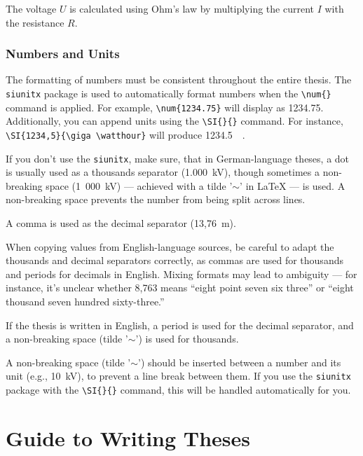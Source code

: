 \documentclass[a4paper, fleqn, headsepline, footsepline, 12pt, parskip=half]{scrartcl}
\begin{document}
The voltage $U$ is calculated using Ohm’s law by multiplying the current $I$ with the resistance $R$.


\subsubsection{Numbers and Units}
\label{sec:numbersAndUnits}

The formatting of numbers must be consistent throughout the entire thesis. The \texttt{siunitx} package is used to automatically format numbers when the \verb|\num{}| command is applied. For example, \verb|\num{1234.75}| will display as \num{1234.75}. Additionally, you can append units using the \verb|\SI{}{}| command. For instance, \verb|\SI{1234,5}{\giga \watthour}| will produce \SI{1234,5}{\giga\watthour}.

If you don't use the \texttt{siunitx}, make sure, that in German-language theses, a dot is usually used as a thousands separator (1.000~kV), though sometimes a non-breaking space (1~000~kV) — achieved with a tilde '$\sim$' in LaTeX — is used. A non-breaking space prevents the number from being split across lines.

A comma is used as the decimal separator (13,76~m).

When copying values from English-language sources, be careful to adapt the thousands and decimal separators correctly, as commas are used for thousands and periods for decimals in English. Mixing formats may lead to ambiguity — for instance, it's unclear whether 8,763 means “eight point seven six three” or “eight thousand seven hundred sixty-three.”

If the thesis is written in English, a period is used for the decimal separator, and a non-breaking space (tilde '$\sim$') is used for thousands.

A non-breaking space (tilde '$\sim$') should be inserted between a number and its unit (e.g., 10~kV), to prevent a line break between them. If you use the \texttt{siunitx} package with the \verb|\SI{}{}| command, this will be handled automatically for you.


\newpage
\section{Guide to Writing Theses}
\label{sec:guideToWritingTheses}
\end{document}
